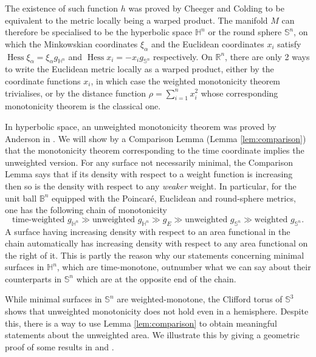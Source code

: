 \documentclass[11pt]{article}
\DeclareMathOperator{\hess}{Hess}
\begin{document}
The existence of such function \(h\) was proved by Cheeger and Colding
\cite{Cheeger.Colding96_LowerBoundsRicci} to be equivalent to the metric locally being a warped product.
The manifold \(M\) can therefore be specialised to be the hyperbolic space \(\mathbb{H}^n\) or the round sphere \(\mathbb{S}^n\), on which the
Minkowskian coordinates \(\xi_\alpha\) and the Euclidean coordinates \(x_i\) satisfy \(\hess \xi_\alpha
  = \xi_\alpha g_{\mathbb{H}^n}\) and \(\hess x_i = -x_i g_{\mathbb{S}^n}\) respectively. 
On \(\mathbb{R}^n\), there are only 2 ways to write the
Euclidean metric locally as a warped product, either by the coordinate functions \(x_i\), in which
case the weighted monotonicity theorem trivialises, or by the distance function \(\rho
  = \sum_{i=1}^n x_i^2\) whose 
corresponding monotonicity theorem is the classical one.

In hyperbolic space, an unweighted monotonicity theorem was proved by Anderson in
\cite{Anderson82_CompleteMinimalVarieties}. We will show by a Comparison Lemma (Lemma \ref{lem:comparison}) that the
monotonicity theorem corresponding to the time coordinate implies
the unweighted version. For any surface not necessarily minimal, the Comparison Lemma
says that if its density with respect to a weight function is increasing
then so is the density with respect to any \emph{weaker}
weight. In particular, for the unit ball \(\mathbb{B}^n\) equipped
with the Poincaré, Euclidean and round-sphere metrics, one has the following chain of monotonicity
\[
   \text{time-weighted }  g_{\mathbb{H}^n} \gg   \text{unweighted } g_{\mathbb{H}^n}
   \gg g_E  \gg \text{unweighted } g_{\mathbb{S}^n}   \gg \text{weighted } g_{\mathbb{S}^n}.
  \]
A surface having increasing density with respect to an area functional in the chain
automatically has increasing density with respect to any area functional on the right of it.
This is partly the reason why our statements concerning minimal surfaces in \(\mathbb{H}^n\), which
are time-monotone, outnumber what we can say about their counterparts in \(\mathbb{S}^n\) which are at the opposite end of the chain. 

While minimal surfaces in \(\mathbb{S}^n\) are weighted-monotone, the Clifford torus of \(\mathbb{S}^3\) shows that unweighted monotonicity does not hold even in a
hemisphere. Despite this, there is a way to use Lemma \ref{lem:comparison} to obtain meaningful
statements about the unweighted area. We illustrate this by giving a geometric proof of
some results in \cite{Cheng.etal84_HeatEquationsMinimal} and
\cite{Hoffman.Spruck74_SobolevIsoperimetricInequalities}. 
\end{document}
